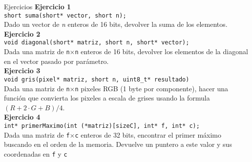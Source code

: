 \documentclass[aspectratio=169]{beamer}
\begin{document}
\begin{frame}[fragile]{Ejercicios}
\small
    \textbf{Ejercicio 1}\\
    \verb|short suma(short* vector, short n);|\\
    Dado un vector de \textit{n} enteros de 16 bits, devolver la suma de los elementos.\\
    \vskip 5pt
    \textbf{Ejercicio 2}\\
    \verb|void diagonal(short* matriz, short n, short* vector);|\\
    Dada una matriz de \texttt{n}$\times$\texttt{n} enteros de 16 bits, devolver los elementos de la diagonal en el vector pasado por parámetro.\\
    \vskip 5pt
    \textbf{Ejercicio 3}\\
    \verb|void gris(pixel* matriz, short n, uint8_t* resultado)|\\
    Dada una matriz de \verb|n|$\times$\verb|n| pixeles RGB (1 byte por componente), hacer una función que convierta los pixeles a escala de grises usando la formula $(R+2 \cdot G+B)/4$.\\
    \vskip 5pt
    \textbf{Ejercicio 4}\\
    \verb|int* primerMaximo(int (*matriz)[sizeC], int* f, int* c);|\\
    Dada una matriz de \texttt{f}$\times$\texttt{c} enteros de 32 bits, encontrar el primer máximo buscando en el orden de la memoria. Devuelve un puntero a este valor y sus coordenadas en \texttt{f} y \texttt{c}\\
\end{frame}

%     
%      
%      
% 
\end{document}
